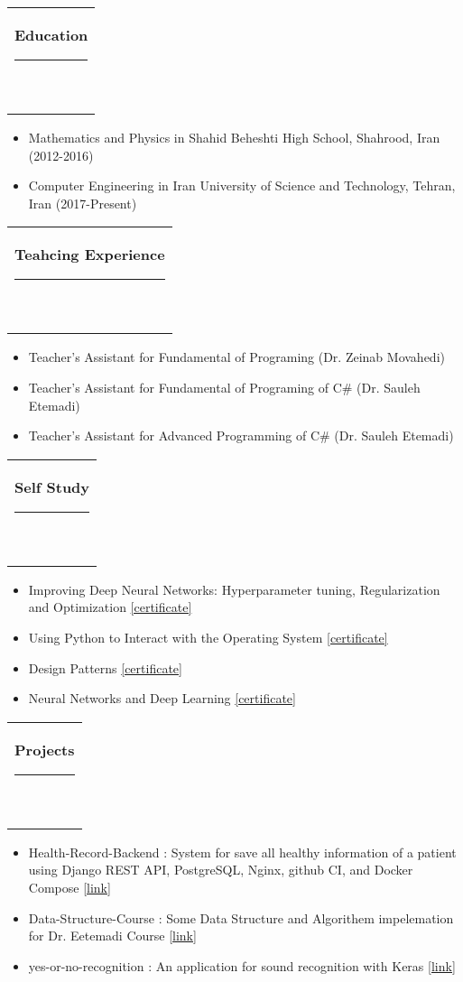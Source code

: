 \documentclass[10pt,A4]{article}
\newcommand{\mpwidth}{\linewidth-\fboxsep-\fboxsep}
\newcommand{\cvtext}[1] {
	\begin{tabular*}{1\mpwidth}{p{0.98\mpwidth}}
		\parbox{1\mpwidth}{#1}
	\end{tabular*}
}
\newcommand{\cvsection}[1] {
	\vspace{14pt}
	\cvtext{
		\textbf{\LARGE{\textcolor{darkColor}{#1}}}\\[-4pt]
		\textcolor{primaryColor}{ \rule{0.1\textwidth}{2pt} } \\
	}
}
\begin{document}
\begin{paracol}{2}
\begin{rightcolumn}
\cvsection{Education}
\begin{itemize}
	\item Mathematics and Physics in Shahid Beheshti High School, Shahrood, Iran (2012-2016)
	\item Computer Engineering in Iran University of Science and Technology, Tehran, Iran (2017-Present)
\end{itemize}

\cvsection{Teahcing Experience}

\begin{itemize}
	\item Teacher's Assistant for Fundamental of Programing (Dr. Zeinab Movahedi)
	\item Teacher's Assistant for Fundamental of Programing of C\# (Dr. Sauleh Etemadi)
	\item Teacher's Assistant for Advanced Programming of C\# (Dr. Sauleh Etemadi)
\end{itemize}

\cvsection{Self Study}

\begin{itemize}
	\item Improving Deep Neural Networks: Hyperparameter tuning, Regularization and Optimization \href{https://www.coursera.org/account/accomplishments/certificate/2GCY2E86E45S}{[certificate]}
	\item Using Python to Interact with the Operating System \href{https://www.coursera.org/account/accomplishments/certificate/GT85JCDVR6H4}{[certificate]}
	\item Design Patterns \href{https://www.coursera.org/account/accomplishments/certificate/H3VA5RWWRT42}{[certificate]}
	\item Neural Networks and Deep Learning \href{https://www.coursera.org/account/accomplishments/certificate/PCA3ZEPX4KA6}{[certificate]}
\end{itemize}

\cvsection{Projects}
\begin{itemize}
	\item Health-Record-Backend : System for save all healthy information of a patient using Django REST API, PostgreSQL, Nginx, github CI, and Docker Compose \href{https://github.com/alrzazz/Health-Record-Backend}{[link]}
	\item Data-Structure-Course : Some Data Structure and Algorithem impelemation for Dr. Eetemadi Course \href{https://github.com/alrzazz/Data-Structure-Course}{[link]}
	\item yes-or-no-recognition : An application for sound recognition with Keras \href{https://github.com/alrzazz/yes-or-no-recognition}{[link]}
\end{itemize}

\end{rightcolumn}
\end{paracol}
\end{document}
